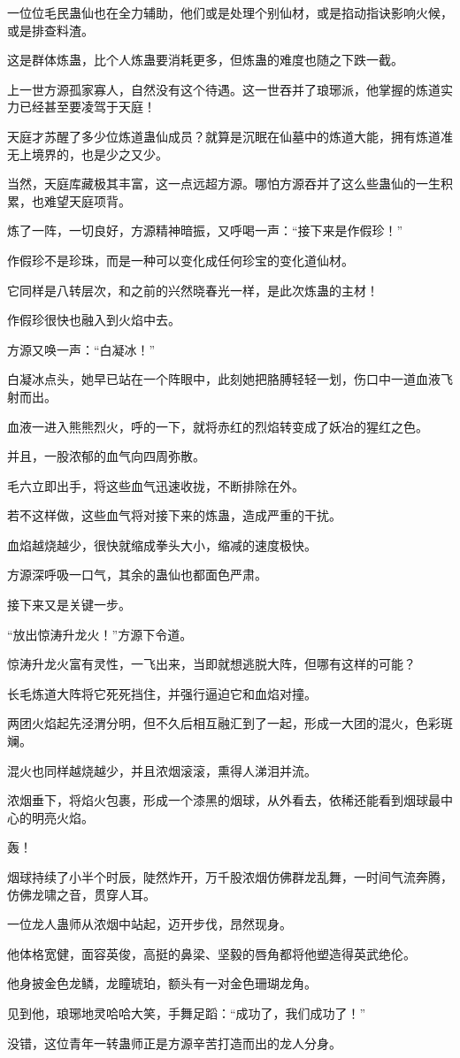 \begin{this_body}
一位位毛民蛊仙也在全力辅助，他们或是处理个别仙材，或是掐动指诀影响火候，或是排查料渣。

这是群体炼蛊，比个人炼蛊要消耗更多，但炼蛊的难度也随之下跌一截。

上一世方源孤家寡人，自然没有这个待遇。这一世吞并了琅琊派，他掌握的炼道实力已经甚至要凌驾于天庭！

天庭才苏醒了多少位炼道蛊仙成员？就算是沉眠在仙墓中的炼道大能，拥有炼道准无上境界的，也是少之又少。

当然，天庭库藏极其丰富，这一点远超方源。哪怕方源吞并了这么些蛊仙的一生积累，也难望天庭项背。

炼了一阵，一切良好，方源精神暗振，又呼喝一声：“接下来是作假珍！”

作假珍不是珍珠，而是一种可以变化成任何珍宝的变化道仙材。

它同样是八转层次，和之前的兴然晓春光一样，是此次炼蛊的主材！

作假珍很快也融入到火焰中去。

方源又唤一声：“白凝冰！”

白凝冰点头，她早已站在一个阵眼中，此刻她把胳膊轻轻一划，伤口中一道血液飞射而出。

血液一进入熊熊烈火，呼的一下，就将赤红的烈焰转变成了妖冶的猩红之色。

并且，一股浓郁的血气向四周弥散。

毛六立即出手，将这些血气迅速收拢，不断排除在外。

若不这样做，这些血气将对接下来的炼蛊，造成严重的干扰。

血焰越烧越少，很快就缩成拳头大小，缩减的速度极快。

方源深呼吸一口气，其余的蛊仙也都面色严肃。

接下来又是关键一步。

“放出惊涛升龙火！”方源下令道。

惊涛升龙火富有灵性，一飞出来，当即就想逃脱大阵，但哪有这样的可能？

长毛炼道大阵将它死死挡住，并强行逼迫它和血焰对撞。

两团火焰起先泾渭分明，但不久后相互融汇到了一起，形成一大团的混火，色彩斑斓。

混火也同样越烧越少，并且浓烟滚滚，熏得人涕泪并流。

浓烟垂下，将焰火包裹，形成一个漆黑的烟球，从外看去，依稀还能看到烟球最中心的明亮火焰。

轰！

烟球持续了小半个时辰，陡然炸开，万千股浓烟仿佛群龙乱舞，一时间气流奔腾，仿佛龙啸之音，贯穿人耳。

一位龙人蛊师从浓烟中站起，迈开步伐，昂然现身。

他体格宽健，面容英俊，高挺的鼻梁、坚毅的唇角都将他塑造得英武绝伦。

他身披金色龙鳞，龙瞳琥珀，额头有一对金色珊瑚龙角。

见到他，琅琊地灵哈哈大笑，手舞足蹈：“成功了，我们成功了！”

没错，这位青年一转蛊师正是方源辛苦打造而出的龙人分身。

\end{this_body}

